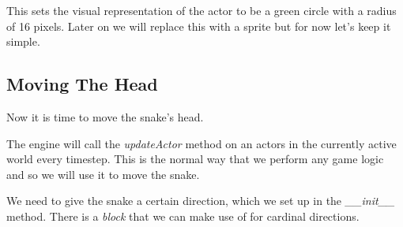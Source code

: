 \documentclass[letterpaper,10pt,english]{sphinxmanual}
\begin{document}
This sets the visual representation of the actor to be a green circle with a radius of 16 pixels.
Later on we will replace this with a sprite but for now let's keep it simple.


\subsection{Moving The Head}
\label{tutorial-1:moving-the-head}
Now it is time to move the snake's head.

The engine will call the \emph{updateActor} method on an actors in the currently active world every
timestep. This is the normal way that we perform any game logic and so we will use it to move
the snake.

We need to give the snake a certain direction, which we set up in the \emph{\_\_init\_\_} method. There
is a \emph{block} that we can make use of for cardinal directions.
\end{document}
